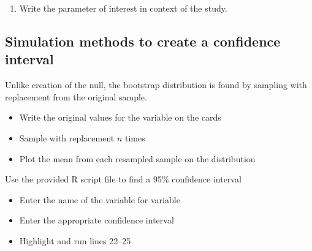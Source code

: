 \documentclass[
]{report}
\newenvironment{Shaded}{\begin{snugshade}}{\end{snugshade}}
\newcommand{\AttributeTok}[1]{\textcolor[rgb]{0.13,0.29,0.53}{#1}}
\newcommand{\CommentTok}[1]{\textcolor[rgb]{0.56,0.35,0.01}{\textit{#1}}}
\newcommand{\DecValTok}[1]{\textcolor[rgb]{0.00,0.00,0.81}{#1}}
\newcommand{\FunctionTok}[1]{\textcolor[rgb]{0.13,0.29,0.53}{\textbf{#1}}}
\newcommand{\NormalTok}[1]{#1}
\newcommand{\SpecialCharTok}[1]{\textcolor[rgb]{0.81,0.36,0.00}{\textbf{#1}}}
\newcommand{\StringTok}[1]{\textcolor[rgb]{0.31,0.60,0.02}{#1}}
\providecommand{\tightlist}{%
  \setlength{\itemsep}{0pt}\setlength{\parskip}{0pt}}
\begin{document}
\vspace{1in}

\begin{enumerate}
\def\labelenumi{\arabic{enumi}.}
\setcounter{enumi}{1}
\tightlist
\item
  Write the parameter of interest in context of the study.
\end{enumerate}

\vspace{1in}

\subsection*{Simulation methods to create a confidence interval}\label{simulation-methods-to-create-a-confidence-interval}

Unlike creation of the null, the bootstrap distribution is found by sampling with replacement from the original sample.

\begin{itemize}
\item
  Write the original values for the variable on the cards
\item
  Sample with replacement \(n\) times
\item
  Plot the mean from each resampled sample on the distribution
\end{itemize}

Use the provided R script file to find a 95\% confidence interval

\begin{itemize}
\item
  Enter the name of the variable for variable
\item
  Enter the appropriate confidence interval
\item
  Highlight and run lines 22--25
\end{itemize}

\begin{Shaded}
\end{Shaded}
\end{document}
